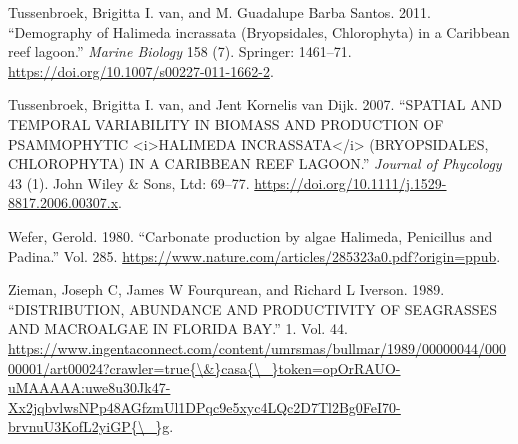 \documentclass[]{article}
\begin{document}
\leavevmode\hypertarget{ref-VanTussenbroek2011}{}%
Tussenbroek, Brigitta I. van, and M. Guadalupe Barba Santos. 2011.
``Demography of Halimeda incrassata (Bryopsidales, Chlorophyta) in a
Caribbean reef lagoon.'' \emph{Marine Biology} 158 (7). Springer:
1461--71. \url{https://doi.org/10.1007/s00227-011-1662-2}.

\leavevmode\hypertarget{ref-VanTussenbroek2007}{}%
Tussenbroek, Brigitta I. van, and Jent Kornelis van Dijk. 2007.
``SPATIAL AND TEMPORAL VARIABILITY IN BIOMASS AND PRODUCTION OF
PSAMMOPHYTIC \textless{}i\textgreater{}HALIMEDA
INCRASSATA\textless{}/i\textgreater{} (BRYOPSIDALES, CHLOROPHYTA) IN A
CARIBBEAN REEF LAGOON.'' \emph{Journal of Phycology} 43 (1). John Wiley
\& Sons, Ltd: 69--77.
\url{https://doi.org/10.1111/j.1529-8817.2006.00307.x}.

\leavevmode\hypertarget{ref-Wefer1980}{}%
Wefer, Gerold. 1980. ``Carbonate production by algae Halimeda,
Penicillus and Padina.'' Vol. 285.
\url{https://www.nature.com/articles/285323a0.pdf?origin=ppub}.

\leavevmode\hypertarget{ref-Zieman1989}{}%
Zieman, Joseph C, James W Fourqurean, and Richard L Iverson. 1989.
``DISTRIBUTION, ABUNDANCE AND PRODUCTIVITY OF SEAGRASSES AND MACROALGAE
IN FLORIDA BAY.'' 1. Vol. 44.
\href{https://www.ingentaconnect.com/content/umrsmas/bullmar/1989/00000044/00000001/art00024?crawler=true\%7B/\&\%7Dcasa\%7B/_\%7Dtoken=opOrRAUO-uMAAAAA:uwe8u30Jk47-Xx2jqbvlwsNPp48AGfzmUl1DPqc9e5xyc4LQc2D7Tl2Bg0FeI70-brvnuU3KofL2yiGP\%7B/_\%7Dg}{https://www.ingentaconnect.com/content/umrsmas/bullmar/1989/00000044/00000001/art00024?crawler=true\{\textbackslash{}\&\}casa\{\textbackslash{}\_\}token=opOrRAUO-uMAAAAA:uwe8u30Jk47-Xx2jqbvlwsNPp48AGfzmUl1DPqc9e5xyc4LQc2D7Tl2Bg0FeI70-brvnuU3KofL2yiGP\{\textbackslash{}\_\}g}.
\end{document}
